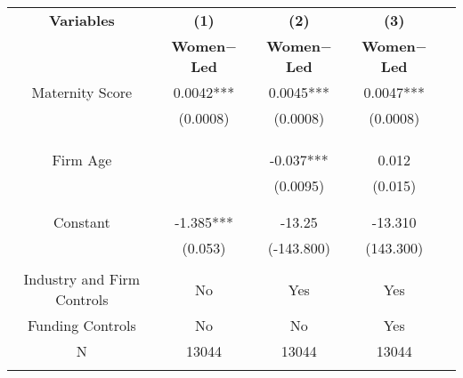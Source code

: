  \begin{table}[htbp]
 \centering
    \begin{tabular}{c c c c c}
    \toprule
    \textbf{Variables} & \textbf{(1)} & \textbf{(2)} & \textbf{(3)}                 \\ 
    \textbf & \textbf{Women$-$Led  } & \textbf{Women$-$Led } & \textbf{Women$-$Led }   \\ 

    \midrule
    Maternity Score      &    0.0042*** &      0.0045***  &      0.0047***   \\
                         &    (0.0008) &     (0.0008)   &   (0.0008)  \\
                         &             &                &                \\

                        &             &                &          \\
                        &             &                &           \\
    Firm Age            &             &   -0.037***   &     0.012        \\
                        &             &      (0.0095)  &   (0.015)       \\
                        &             &                &                \\
                        &             &                &               \\
Constant                &  -1.385***  &   -13.25       &    -13.310              \\
                        &   (0.053)   &  (-143.800)   &     (143.300)           \\
                        &             &                &              \\

Industry and Firm Controls   &   No        &   Yes       &       Yes    \\
    Funding Controls    &   No             &   No        &      Yes        \\

    \midrule
     N                  &   13044          &      13044  &      13044      \\          
    \bottomrule
    \addlinespace[1ex]
    \multicolumn{3}{l}{\textsuperscript{***}$p<0.01$, 
      \textsuperscript{**}$p<0.05$, 
      \textsuperscript{*}$p<0.1$}
    \end{tabular}
\end{table}
